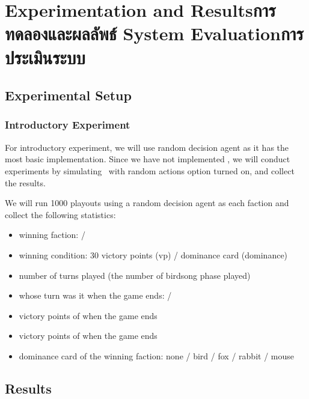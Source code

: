 \chapter{\ifproject%
\ifenglish Experimentation and Results\else การทดลองและผลลัพธ์\fi
\else%
\ifenglish System Evaluation\else การประเมินระบบ\fi
\fi}



\section{Experimental Setup}

\subsection{Introductory Experiment}
For introductory experiment, we will use random decision agent as it has the most basic implementation. Since we have not implemented \RootAI, we will conduct experiments by simulating \RootOurs \ with random actions option turned on, and collect the results. 

We will run 1000 \glspl{playout} using a random decision agent as each faction and collect the following statistics:
\begin{itemize}
    \item winning faction: \Marquise{} / \Eyrie
    \item winning condition: 30 victory points (vp) / dominance card (dominance)
    \item number of turns played (the number of birdsong phase played)
    \item whose turn was it when the game ends: \Marquise{} / \Eyrie
    \item victory points of \Marquise{} when the game ends
    \item victory points of \Eyrie{} when the game ends
    \item dominance card of the winning faction: none / bird / fox / rabbit / mouse
\end{itemize}

\section{Results}

